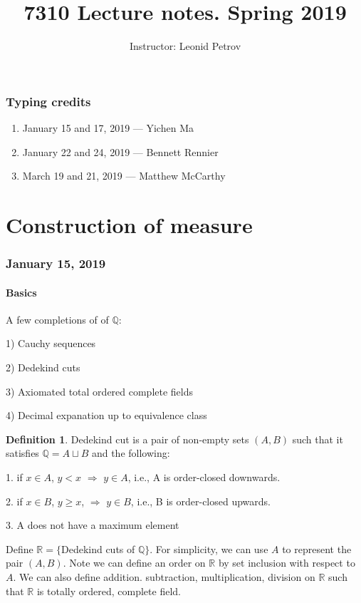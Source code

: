 \documentclass{article}
\title{7310 Lecture notes. Spring 2019}
\author{Instructor: Leonid Petrov}
\date{}
\theoremstyle{definition}
\newtheorem{definition}[theorem]{Definition}
\begin{document}
\maketitle

\section*{Typing credits}

\begin{enumerate}
	\item January 15 and 17, 2019 --- Yichen Ma
	\item January 22 and 24, 2019 --- Bennett Rennier
	\item March 19 and 21, 2019 --- Matthew McCarthy
\end{enumerate}

\tableofcontents

\part{Construction of measure}

\section{January 15, 2019}

\subsection{Basics}

A few completions of of $\mathbb{Q}$:

1) Cauchy sequences

2) Dedekind cuts

3) Axiomated total ordered complete fields

4) Decimal expanation up to equivalence class


\begin{definition}
Dedekind cut is a pair of non-empty sets $(A,B)$ such that it satisfies $\mathbb{Q} = A \sqcup B$ and the following:

1. if $x \in A$, $y < x$ $\Longrightarrow$ $y \in A$, i.e., A is order-closed downwards.

2. if $x \in B$, $y \geq x$, $\Longrightarrow$ $y \in B$, i.e., B is order-closed upwards.

3. A does not have a maximum element
\end{definition}
Define $\mathbb{R} = \{$Dedekind cuts of $\mathbb{Q}\}$. For simplicity, we can use $A$ to represent the pair $(A,B)$. Note we can define an order on $\mathbb{R}$ by set inclusion with respect to $A$. We can also define addition. subtraction, multiplication, division on $\mathbb{R}$ such that $\mathbb{R}$ is totally ordered, complete field.
\end{document}
